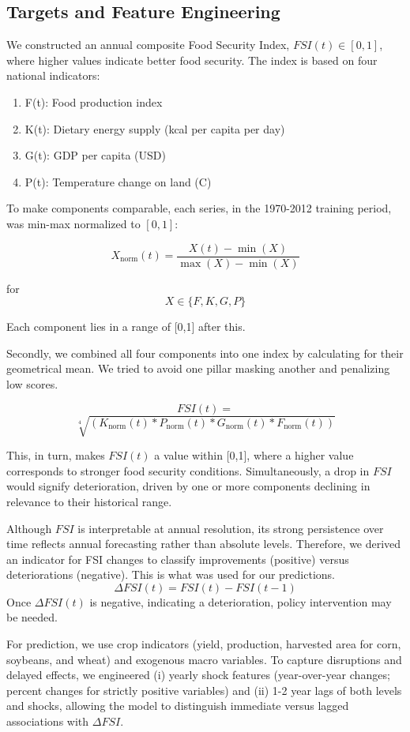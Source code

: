 \documentclass[10pt,twocolumn,letterpaper]{article}
\begin{document}
\subsection{Targets and Feature Engineering}

We constructed an annual composite Food Security Index, $FSI(t)\in[0,1]$, where higher values indicate better food security. The index is based on four national indicators:
\begin{enumerate}
\item F(t): Food production index
\item K(t): Dietary energy supply (kcal per capita per day)
\item G(t): GDP per capita (USD) 
\item P(t): Temperature change on land (\textdegree{}C)
\end{enumerate}

To make components comparable, each series, in the 1970-2012 training period, was min-max normalized to $[0,1]$:

$$X_{\text{norm}}(t) = \frac{X(t) - \min(X)}{\max(X) - \min(X)}$$

for $$X \in \{F, K, G, P\}$$

Each component lies in a range of [0,1] after this.

Secondly, we combined all four components into one index by calculating for their geometrical mean. We tried to avoid one pillar masking another and penalizing low scores.

$$FSI(t) = $$
$$\sqrt[4]{\left( {K_{\text{norm}}(t)*P_{\text{norm}}(t)*G_{\text{norm}}(t)*F_{\text{norm}}(t)} \right)}$$

This, in turn, makes $FSI(t)$ a value within [0,1], where a higher value corresponds to stronger food security conditions. Simultaneously, a drop in $FSI$ would signify deterioration, driven by one or more components declining in relevance to their historical range.

Although $FSI$ is interpretable at annual resolution, its strong persistence over time reflects annual forecasting rather than absolute levels. Therefore, we derived an indicator for FSI changes to classify improvements (positive) versus deteriorations (negative). This is what was used for our predictions.
$$\Delta FSI(t) = FSI(t) - FSI(t-1)$$
Once $\Delta FSI(t)$ is negative, indicating a deterioration, policy intervention may be needed. 

For prediction, we use crop indicators (yield, production, harvested area for corn, soybeans, and wheat) and exogenous macro variables. To capture disruptions and delayed effects, we engineered (i) yearly shock features (year-over-year changes; percent changes for strictly positive variables) and (ii) 1-2 year lags of both levels and shocks, allowing the model to distinguish immediate versus lagged associations with $\Delta FSI$.
\end{document}
